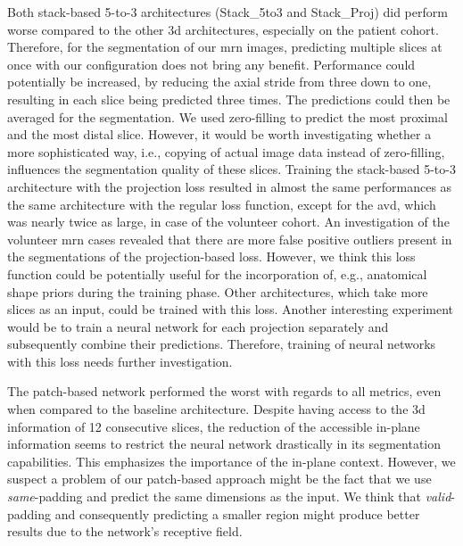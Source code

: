 Both stack-based 5-to-3 architectures (Stack\_5to3 and Stack\_Proj) did perform worse compared to the other \gls{3d} architectures, especially on the patient cohort. Therefore, for the segmentation of our \gls{mrn} images, predicting multiple slices at once with our configuration does not bring any benefit. Performance could potentially be increased, by reducing the axial stride from three down to one, resulting in each slice being predicted three times. The predictions could then be averaged for the segmentation. We used zero-filling to predict the most proximal and the most distal slice. However, it would be worth investigating whether a more sophisticated way, i.e., copying of actual image data instead of zero-filling, influences the segmentation quality of these slices.
Training the stack-based 5-to-3 architecture with the projection loss resulted in almost the same performances as the same architecture with the regular loss function, except for the \acrlong{avd}, which was nearly twice as large, in case of the volunteer cohort. An investigation of the volunteer \gls{mrn} cases revealed that there are more false positive outliers present in the segmentations of the projection-based loss. However, we think this loss function could be potentially useful for the incorporation of, e.g., anatomical shape priors during the training phase. Other architectures, which take more slices as an input, could be trained with this loss. Another interesting experiment would be to train a neural network for each projection separately and subsequently combine their predictions. Therefore, training of neural networks with this loss needs further investigation.

The patch-based network performed the worst with regards to all metrics, even when compared to the baseline architecture. Despite having access to the \gls{3d} information of 12 consecutive slices, the reduction of the accessible in-plane information seems to restrict the neural network drastically in its segmentation capabilities. This emphasizes the importance of the in-plane context. However, we suspect a problem of our patch-based approach might be the fact that we use \textit{same}-padding and predict the same dimensions as the input. We think that \textit{valid}-padding and consequently predicting a smaller region might produce better results due to the network's receptive field.

